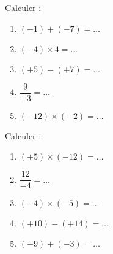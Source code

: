 \begin{minipage}{0.485\textwidth}

    Calculer :
    \begin{enumerate}
        \item
            \( (-1)+(-7)=\ldots\)
        \item
            \( (-4)\times 4=\ldots\)
        \item
            \( (+5)-(+7)=\ldots\)
        \item
            \( \dfrac{ 9 }{ -3 }=\ldots\)
        \item
            \( (-12)\times (-2)=\ldots\)
    \end{enumerate}

\end{minipage}
\begin{minipage}{0.485\textwidth}

    Calculer :
    \begin{enumerate}
        \item
            \( (+5)\times (-12)=\ldots\)
        \item
            \( \dfrac{ 12 }{ -4 }=\ldots\)
        \item
            \( (-4)\times (-5)=\ldots\)
        \item
            \( (+10)-(+14)=\ldots\)
        \item
            \( (-9)+(-3)=\ldots\)
    \end{enumerate}


\end{minipage}
